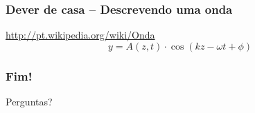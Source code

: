 \begin{frame}
  \frametitle{Dever de casa -- Descrevendo uma onda}
    \begin{block}{}
        \url{http://pt.wikipedia.org/wiki/Onda}
        \[
          y=A(z,t)\cdot \cos (kz - \omega t + \phi)
        \]
    \end{block}
\end{frame}


{%
\begin{frame}
    \frametitle{Fim!}
        \begin{center}
            Perguntas?
        \end{center}
\vspace*{10cm}
\end{frame}
}


